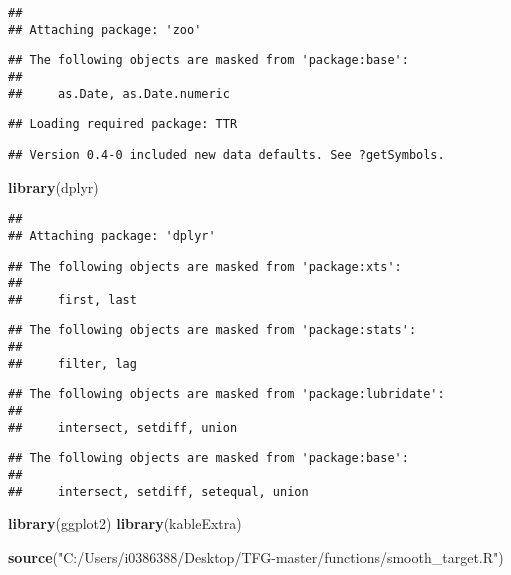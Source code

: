 \documentclass[]{article}
\newenvironment{Shaded}{\begin{snugshade}}{\end{snugshade}}
\newcommand{\KeywordTok}[1]{\textcolor[rgb]{0.13,0.29,0.53}{\textbf{#1}}}
\newcommand{\StringTok}[1]{\textcolor[rgb]{0.31,0.60,0.02}{#1}}
\newcommand{\NormalTok}[1]{#1}
\begin{document}
\begin{verbatim}
## 
## Attaching package: 'zoo'
\end{verbatim}

\begin{verbatim}
## The following objects are masked from 'package:base':
## 
##     as.Date, as.Date.numeric
\end{verbatim}

\begin{verbatim}
## Loading required package: TTR
\end{verbatim}

\begin{verbatim}
## Version 0.4-0 included new data defaults. See ?getSymbols.
\end{verbatim}

\begin{Shaded}
\begin{Highlighting}[]
\KeywordTok{library}\NormalTok{(dplyr)}
\end{Highlighting}
\end{Shaded}

\begin{verbatim}
## 
## Attaching package: 'dplyr'
\end{verbatim}

\begin{verbatim}
## The following objects are masked from 'package:xts':
## 
##     first, last
\end{verbatim}

\begin{verbatim}
## The following objects are masked from 'package:stats':
## 
##     filter, lag
\end{verbatim}

\begin{verbatim}
## The following objects are masked from 'package:lubridate':
## 
##     intersect, setdiff, union
\end{verbatim}

\begin{verbatim}
## The following objects are masked from 'package:base':
## 
##     intersect, setdiff, setequal, union
\end{verbatim}

\begin{Shaded}
\begin{Highlighting}[]
\KeywordTok{library}\NormalTok{(ggplot2)}
\KeywordTok{library}\NormalTok{(kableExtra)}

\KeywordTok{source}\NormalTok{(}\StringTok{"C:/Users/i0386388/Desktop/TFG-master/functions/smooth_target.R"}\NormalTok{)}
\end{Highlighting}
\end{Shaded}
\end{document}
